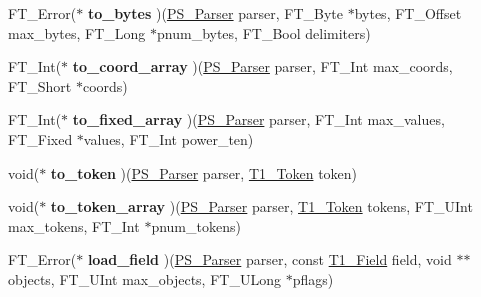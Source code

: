 \begin{DoxyCompactItemize}
\item 
F\+T\+\_\+\+Error($\ast$ {\bfseries to\+\_\+bytes} )(\hyperlink{struct_p_s___parser_rec__}{P\+S\+\_\+\+Parser} parser, F\+T\+\_\+\+Byte $\ast$bytes, F\+T\+\_\+\+Offset max\+\_\+bytes, F\+T\+\_\+\+Long $\ast$pnum\+\_\+bytes, F\+T\+\_\+\+Bool delimiters)\hypertarget{struct_p_s___parser___funcs_rec___a503bd14ed4727e0edea792d2e7225fd3}{}\label{struct_p_s___parser___funcs_rec___a503bd14ed4727e0edea792d2e7225fd3}

\item 
F\+T\+\_\+\+Int($\ast$ {\bfseries to\+\_\+coord\+\_\+array} )(\hyperlink{struct_p_s___parser_rec__}{P\+S\+\_\+\+Parser} parser, F\+T\+\_\+\+Int max\+\_\+coords, F\+T\+\_\+\+Short $\ast$coords)\hypertarget{struct_p_s___parser___funcs_rec___aa2057732838e9a5669f65e5299aff78e}{}\label{struct_p_s___parser___funcs_rec___aa2057732838e9a5669f65e5299aff78e}

\item 
F\+T\+\_\+\+Int($\ast$ {\bfseries to\+\_\+fixed\+\_\+array} )(\hyperlink{struct_p_s___parser_rec__}{P\+S\+\_\+\+Parser} parser, F\+T\+\_\+\+Int max\+\_\+values, F\+T\+\_\+\+Fixed $\ast$values, F\+T\+\_\+\+Int power\+\_\+ten)\hypertarget{struct_p_s___parser___funcs_rec___a88946710b0c177f3730c49e43abba7ee}{}\label{struct_p_s___parser___funcs_rec___a88946710b0c177f3730c49e43abba7ee}

\item 
void($\ast$ {\bfseries to\+\_\+token} )(\hyperlink{struct_p_s___parser_rec__}{P\+S\+\_\+\+Parser} parser, \hyperlink{struct_t1___token_rec__}{T1\+\_\+\+Token} token)\hypertarget{struct_p_s___parser___funcs_rec___a03298b95d48251efe9d74d9e1c7bef03}{}\label{struct_p_s___parser___funcs_rec___a03298b95d48251efe9d74d9e1c7bef03}

\item 
void($\ast$ {\bfseries to\+\_\+token\+\_\+array} )(\hyperlink{struct_p_s___parser_rec__}{P\+S\+\_\+\+Parser} parser, \hyperlink{struct_t1___token_rec__}{T1\+\_\+\+Token} tokens, F\+T\+\_\+\+U\+Int max\+\_\+tokens, F\+T\+\_\+\+Int $\ast$pnum\+\_\+tokens)\hypertarget{struct_p_s___parser___funcs_rec___af2bf35eb7dd33653d97f34c6cf1b47bd}{}\label{struct_p_s___parser___funcs_rec___af2bf35eb7dd33653d97f34c6cf1b47bd}

\item 
F\+T\+\_\+\+Error($\ast$ {\bfseries load\+\_\+field} )(\hyperlink{struct_p_s___parser_rec__}{P\+S\+\_\+\+Parser} parser, const \hyperlink{struct_t1___field_rec__}{T1\+\_\+\+Field} field, void $\ast$$\ast$objects, F\+T\+\_\+\+U\+Int max\+\_\+objects, F\+T\+\_\+\+U\+Long $\ast$pflags)\hypertarget{struct_p_s___parser___funcs_rec___a33c37608a63a065ee93fd346a44f0404}{}\label{struct_p_s___parser___funcs_rec___a33c37608a63a065ee93fd346a44f0404}


\end{DoxyCompactItemize}
